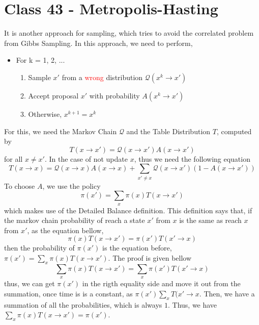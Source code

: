 \documentclass{article}
\begin{document}
\section{Class 43 - Metropolis-Hasting}
It is another approach for sampling, which tries to avoid the correlated problem from Gibbs Sampling. In this approach, we need to perform,
\begin{itemize}
    \item For k = 1, 2, ... \begin{enumerate}
        \item Sample $x'$ from a \textcolor{red}{wrong} distribution $\mathcal{Q}(x^k \rightarrow x')$
        \item Accept proposal $x'$ with probability $A(x^k \rightarrow x')$
        \item Otherwise, $x^{k+1} = x^k$
    \end{enumerate}
\end{itemize}
For this, we need the Markov Chain $\mathcal{Q}$ and the Table Distribution $T$, computed by
\begin{equation}
    T(x \rightarrow x') = \mathcal{Q}(x \rightarrow x')A(x \rightarrow x')
\end{equation}
for all $x \neq x'$. In the case of not update $x$, thus we need the following equation
\begin{equation}
    T(x \rightarrow x) = \mathcal{Q}(x \rightarrow x)A(x \rightarrow x) + \sum_{x'\neq x} \mathcal{Q}(x \rightarrow x')(1 - A(x \rightarrow x'))
\end{equation}
To choose $A$, we use the policy
\begin{equation}
    \pi(x') = \sum_x \pi(x)T(x\rightarrow x')
\end{equation}
which makes use of the Detailed Balance definition. This definition says that, if the markov chain probability of reach a state $x'$ from $x$ is the same as reach $x$ from $x'$, as the equation bellow,
\begin{equation}
    \pi(x)T(x \rightarrow x') = \pi(x')T(x' \rightarrow x)
\end{equation}
then the probability of $\pi(x')$ is the equation before, $\pi(x') = \sum_x \pi(x)T(x\rightarrow x')$. The proof is given bellow
\begin{equation}
    \sum_x \pi(x)T(x\rightarrow x') = \sum_x \pi(x')T(x'\rightarrow x)
\end{equation}
thus, we can get $\pi(x')$ in the rigth equality side and move it out from the summation, once time is is a constant, as $\pi(x') \sum_x T(x'\rightarrow x$. Then, we have a summation of all the probabilities, which is always $1$. Thus, we have $\sum_x \pi(x)T(x\rightarrow x') =  \pi(x')$.
\end{document}
